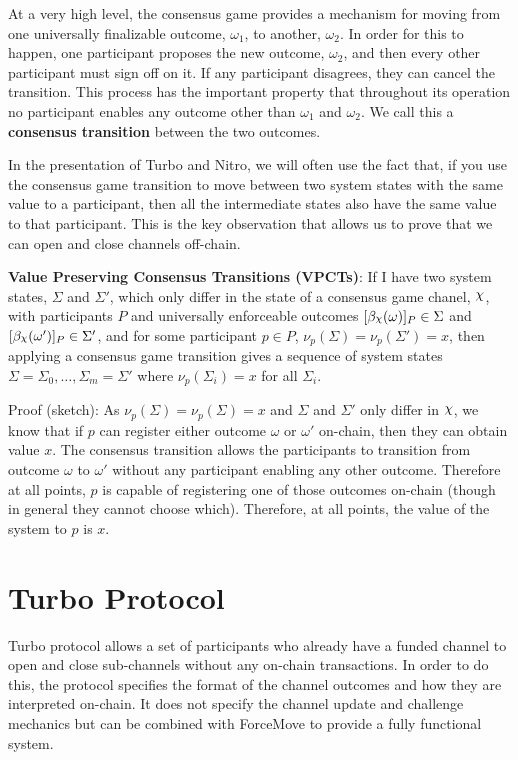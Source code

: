 \documentclass{article}
\DeclareRobustCommand{\rchi}{{\mathpalette\irchi\relax}}
\newcommand{\irchi}[2]{\raisebox{\depth}{$#1\chi$}} %
\theoremstyle{definition}
\newcommand{\enf}[1]{[#1]}
\begin{document}
At a very high level, the consensus game provides a mechanism for moving from one universally
finalizable outcome, $\omega_1$, to another, $\omega_2$. 
In order for this to happen, one participant proposes the new outcome, $\omega_2$, and then
every other participant must sign off on it. 
If any participant disagrees, they can cancel the transition.
This process has the important property that throughout its operation no participant enables
any outcome other than $\omega_1$ and $\omega_2$.
We call this a \textbf{consensus transition} between the two outcomes.

In the presentation of Turbo and Nitro, we will often use the fact that, if you use the
consensus game transition to move between two system states with the same value to a
participant, then all the intermediate states also have the same value to that participant.
This is the key observation that allows us to prove that we can open and close channels
off-chain.

\textbf{Value Preserving Consensus Transitions (VPCTs)}:
If I have two system states, $\Sigma$ and $\Sigma'$, which only differ in the state of
a consensus game chanel, $\rchi$, with participants $P$ and universally enforceable outcomes
$\enf{\beta_\rchi(\omega)}_P \in \Sigma$ and $\enf{\beta_\rchi(\omega')}_P \in \Sigma'$, and 
for some participant $p \in P$, $\nu_p(\Sigma) = \nu_p(\Sigma') = x$, then
applying a consensus game transition gives a sequence of system states 
$\Sigma = \Sigma_0, \dots, \Sigma_m = \Sigma'$ where $\nu_p(\Sigma_i) = x$ for all $\Sigma_i$.

Proof (sketch): As $\nu_p(\Sigma) = \nu_p(\Sigma) = x$ and $\Sigma$ and $\Sigma'$ only differ
in $\rchi$, we know that if $p$ can register either outcome $\omega$ or $\omega'$ on-chain, then
they can obtain value $x$. The consensus transition allows the participants to transition
from outcome $\omega$ to $\omega'$ without any participant enabling any other outcome.
Therefore at all points, $p$ is capable of registering one of those outcomes on-chain (though
in general they cannot choose which).
Therefore, at all points, the value of the system to $p$ is $x$.

\section{Turbo Protocol}

Turbo protocol allows a set of participants who already have a funded channel to open and
close sub-channels without any on-chain transactions. 
In order to do this, the protocol specifies the format of the channel outcomes and how
they are interpreted on-chain.
It does not specify the channel update and challenge mechanics but can be combined with
ForceMove to provide a fully functional system.
\end{document}
